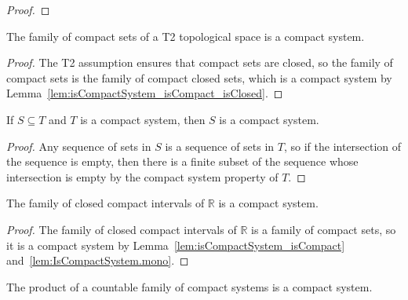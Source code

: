 \begin{proof}  

\end{proof}


\begin{lemma}\label{lem:isCompactSystem_isCompact}
The family of compact sets of a T2 topological space is a compact system.
\end{lemma}

\begin{proof}  
The T2 assumption ensures that compact sets are closed, so the family of compact sets is the family of compact closed sets, which is a compact system by Lemma~\ref{lem:isCompactSystem_isCompact_isClosed}.
\end{proof}


\begin{lemma}\label{lem:IsCompactSystem.mono}
If $S \subseteq T$ and $T$ is a compact system, then $S$ is a compact system.
\end{lemma}

\begin{proof}  
Any sequence of sets in $S$ is a sequence of sets in $T$, so if the intersection of the sequence is empty, then there is a finite subset of the sequence whose intersection is empty by the compact system property of $T$.
\end{proof}


\begin{lemma}\label{lem:isCompactSystem_Icc}
  \leanok
The family of closed compact intervals of $\mathbb{R}$ is a compact system.
\end{lemma}

\begin{proof}\leanok
The family of closed compact intervals of $\mathbb{R}$ is a family of compact sets, so it is a compact system by Lemma~\ref{lem:isCompactSystem_isCompact} and~\ref{lem:IsCompactSystem.mono}.
\end{proof}


\begin{lemma}\label{lem:IsCompactSystem.pi}
The product of a countable family of compact systems is a compact system.
\end{lemma}

